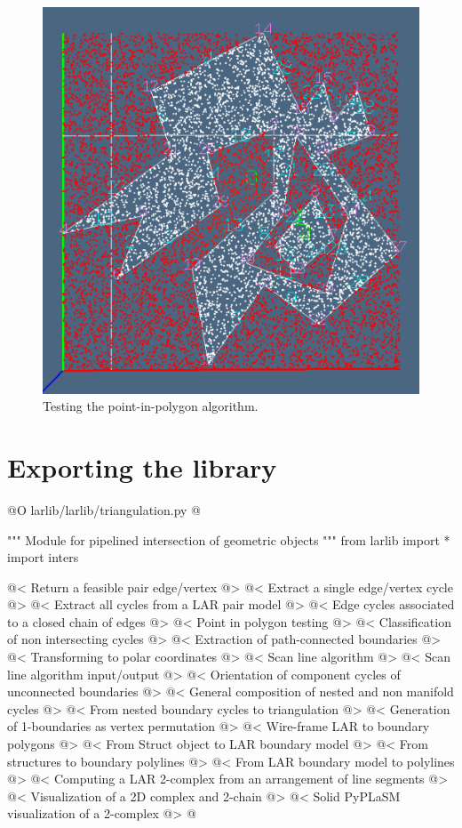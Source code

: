 \documentclass[11pt,oneside]{article}    %
\begin{document}
\begin{figure}[htbp] %
   \centering
   \includegraphics[width=0.5\linewidth]{images/pointInPolygon} 
   \caption{Testing the point-in-polygon algorithm.}
   \label{fig:pointInPolygon}
\end{figure}


\section{Exporting the library}

@O larlib/larlib/triangulation.py
@{""" Module for pipelined intersection of geometric objects """
from larlib import *
import inters

@< Return a feasible pair edge/vertex @>
@< Extract a single edge/vertex cycle @>
@< Extract all cycles from a LAR pair model @>
@< Edge cycles associated to a closed chain of edges @>
@< Point in polygon testing @>
@< Classification of non intersecting cycles @>
@< Extraction of path-connected boundaries @>
@< Transforming to polar coordinates @>
@< Scan line algorithm @>
@< Scan line algorithm input/output @>
@< Orientation of component cycles of unconnected boundaries @>
@< General composition of nested and non manifold cycles @>
@< From nested boundary cycles to triangulation @>
@< Generation of 1-boundaries as vertex permutation @>
@< Wire-frame LAR to boundary polygons @>
@< From Struct object to LAR boundary model @>
@< From structures to boundary polylines @>
@< From LAR boundary model to polylines @>
@< Computing a LAR 2-complex from an arrangement of line segments @>
@< Visualization of a 2D complex and 2-chain @>
@< Solid PyPLaSM visualization of a 2-complex @>
@}
\end{document}
